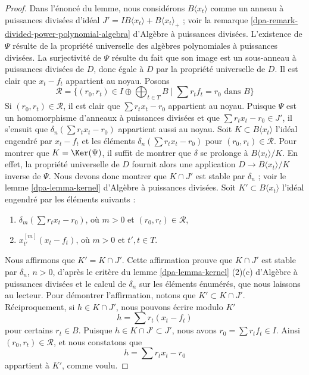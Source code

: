 \begin{proof}
Dans l'énoncé du lemme, nous considérons $B\langle x_t \rangle$
comme un anneau à puissances divisées d'idéal
$J' = IB\langle x_t \rangle + B\langle x_t \rangle_{+}$ ; voir la
remarque \ref{dpa-remark-divided-power-polynomial-algebra} d'Algèbre à puissances divisées.
L'existence de $\Psi$ résulte de la propriété universelle des
algèbres polynomiales à puissances divisées. La surjectivité de $\Psi$ résulte
du fait que son image est un sous-anneau à puissances divisées de $D$, donc égale à $D$
par la propriété universelle de $D$. Il est clair que
$x_t - f_t$ appartient au noyau. Posons
$$
\mathcal{R} = \{(r_0, r_t) \in I \oplus \bigoplus\nolimits_{t \in T} B
\mid \sum r_t f_t = r_0 \text{ dans }B\}
$$
Si $(r_0, r_t) \in \mathcal{R}$, il est clair que
$\sum r_t x_t - r_0$ appartient au noyau.
Puisque $\Psi$ est un homomorphisme d'anneaux à puissances divisées
et que $\sum r_tx_t - r_0 \in J'$,
il s'ensuit que $\delta_n(\sum r_t x_t - r_0)$ appartient aussi au noyau.
Soit $K \subset B\langle x_t \rangle$ l'idéal engendré par
$x_t - f_t$ et les éléments $\delta_n(\sum r_t x_t - r_0)$ pour
$(r_0, r_t) \in \mathcal{R}$.
Pour montrer que $K = \Ker(\Psi)$, il suffit de montrer que
$\delta$ se prolonge à $B\langle x_t \rangle/K$. En effet, la propriété
universelle de $D$ fournit alors une application $D \to B\langle x_t \rangle/K$
inverse de $\Psi$. Nous devons donc montrer que $K \cap J'$ est
stable par $\delta_n$ ; voir le
lemme \ref{dpa-lemma-kernel} d'Algèbre à puissances divisées.
Soit $K' \subset B\langle x_t \rangle$ l'idéal
engendré par les éléments suivants :
\begin{enumerate}
\item $\delta_m(\sum r_t x_t - r_0)$, où $m > 0$ et
$(r_0, r_t) \in \mathcal{R}$,
\item $x_{t'}^{[m]}(x_t - f_t)$, où $m > 0$ et $t', t \in T$.
\end{enumerate}
Nous affirmons que $K' = K \cap J'$. Cette affirmation prouve que $K \cap J'$
est stable par $\delta_n$, $n > 0$, d'après le critère du
lemme \ref{dpa-lemma-kernel} (2)(c) d'Algèbre à puissances divisées
et le calcul de $\delta_n$ sur
les éléments énumérés, que nous laissons au lecteur.
Pour démontrer l'affirmation, notons que $K' \subset K \cap J'$.
Réciproquement, si $h \in K \cap J'$, nous pouvons écrire modulo $K'$
$$
h = \sum r_t (x_t - f_t)
$$
pour certains $r_t \in B$. Puisque $h \in K \cap J' \subset J'$,
nous avons $r_0 = \sum r_t f_t \in I$. Ainsi $(r_0, r_t) \in \mathcal{R}$,
et nous constatons que
$$
h = \sum r_t x_t - r_0
$$
appartient à $K'$, comme voulu.
\end{proof}


